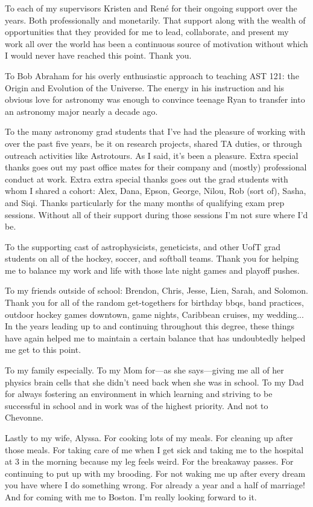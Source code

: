 To each of my supervisors Kristen and Ren\'e for their ongoing support over the
years. Both professionally and monetarily. That support along with the wealth
of opportunities that they provided for me to lead, collaborate, and
present my work all over the world has been a continuous source of motivation
without which I would never have reached this point. Thank you.

To Bob Abraham for his overly enthusiastic approach to teaching AST
121: the Origin and Evolution of the Universe. The energy in his instruction
and his obvious love for astronomy was enough to convince teenage Ryan to
transfer into an astronomy major nearly a decade ago. 

To the many astronomy grad students that I've had the pleasure of working with
over the past five years, be it on research projects, shared TA duties, or
through outreach activities like Astrotours. As I said, it's been a pleasure.
Extra special thanks goes out my past office mates for their company and
(mostly) professional conduct at work.
Extra extra special thanks goes out the grad students with whom I shared a
cohort: Alex, Dana, Epson,
George, Nilou, Rob (sort of), Sasha, and Siqi. Thanks particularly for the many months
of qualifying exam prep sessions. Without all of their support during those
sessions I'm not sure where I'd be.

To the supporting cast of
astrophysicists, geneticists, and other UofT grad students on all of the
hockey, soccer, and softball teams. Thank you for helping me to balance my work
and life with those late night games and playoff pushes.

To my friends outside of school: Brendon, Chris, Jesse, Lien, Sarah, and
Solomon.
Thank you for all of the random get-togethers for birthday bbqs, band practices,
outdoor hockey games downtown, game nights, Caribbean cruises, my wedding... 
In the years leading up to and continuing throughout this degree, these things
have again helped me to maintain a certain balance that has undoubtedly helped
me get to this point.

To my family especially. To my Mom for---as she says---giving me all of
her physics
brain cells that she didn't need back when she was in school. To my Dad for
always fostering an environment in which learning and striving to be
successful in school and in work was of the highest priority. And not to
Chevonne.

Lastly to my wife, Alyssa. For cooking lots of my meals. For cleaning up after those
meals. For taking care of me when I get sick and taking me to the hospital at 3
in the morning because my leg feels weird. For the breakaway passes.
For continuing to put up with my brooding. For not waking me up after every
dream you have where I do something wrong. For already a year and a half of
marriage! And for coming with me to Boston. I'm really looking forward to it.
